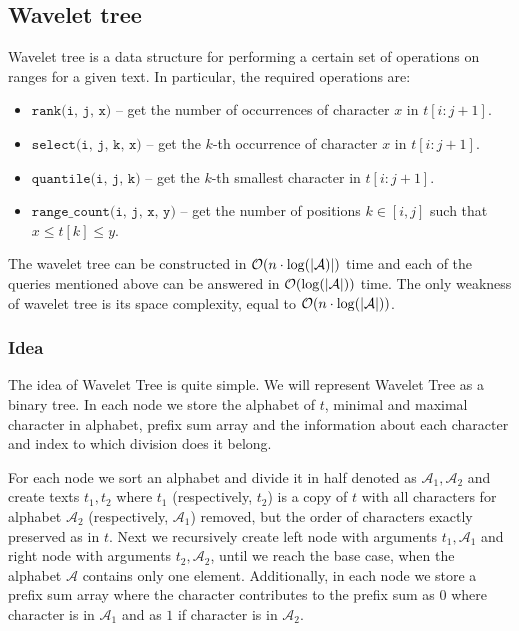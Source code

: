 \subsection{Wavelet tree}
\label{subsection:WaveletTree}
Wavelet tree is a data structure for performing a certain set of operations on ranges for a given text. In particular, the required operations are:
\begin{itemize}
    \item $\texttt{rank(i, j, x)}$ -- get the number of occurrences of character $x$ in $t[i : j+1]$.
    \item $\texttt{select(i, j, k, x)}$ -- get the $k$-th occurrence of character $x$ in $t[i : j+1]$.
    \item $\texttt{quantile(i, j, k)}$ --  get the $k$-th smallest character in $t[i : j+1]$.
    \item $\texttt{range\_count(i, j, x, y)}$ -- get the number of positions $k \in [i,j]$ such that $x \leq t[k] \leq y$.
\end{itemize}

The wavelet tree can be constructed in $\mathcal{O}(n\cdot \log(|\mathcal{A})|)$ time and each of the queries mentioned above can be answered in $\mathcal{O}(\log(|\mathcal{A}|))$ time. The only weakness of wavelet tree is its space complexity, equal to $\mathcal{O}(n\cdot \log(|\mathcal{A}|))$.

\subsubsection{Idea}
The idea of Wavelet Tree is quite simple. We will represent Wavelet Tree as a binary tree. In each node we store the alphabet of $t$, minimal and maximal character in alphabet, prefix sum array and the information about each character and index to which division does it belong.


For each node we sort an alphabet and divide it in half denoted as $\mathcal{A}_1, \mathcal{A}_2$ and create texts $t_1,t_2$ where $t_1$ (respectively, $t_2$) is a copy of $t$ with all characters for alphabet $\mathcal{A}_2$ (respectively, $\mathcal{A}_1$) removed, but the order of characters exactly preserved as in $t$. Next we recursively create left node with arguments $t_1,\mathcal{A}_1$ and right node with arguments $t_2, \mathcal{A}_2$, until we reach the base case, when the alphabet $\mathcal{A}$ contains only one element. Additionally, in each node we store a prefix sum array where the character contributes to the prefix sum as $0$ where character is in $\mathcal{A}_1$ and as $1$ if character is in $\mathcal{A}_2$.

